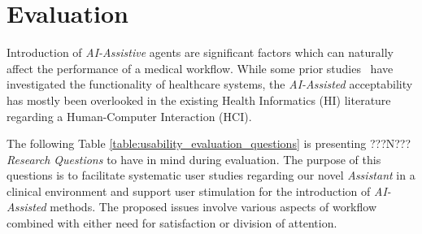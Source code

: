 
\section{Evaluation}
\label{sec:sec006}

Introduction of \textit{AI-Assistive} agents are significant factors which can naturally affect the performance of a medical workflow. While some prior studies~\cite{Calisto:2017:TTM:3132272.3134111, calistobreastscreening, calisto2017mimbcdui} have investigated the functionality of healthcare systems, the \textit{AI-Assisted} acceptability has mostly been overlooked in the existing Health Informatics (HI) literature regarding a Human-Computer Interaction (HCI).

The following Table \ref{table:usability_evaluation_questions} is presenting ???N??? \textit{Research Questions} to have in mind during evaluation. The purpose of this questions is to facilitate systematic user studies regarding our novel \textit{Assistant} in a clinical environment and support user stimulation for the introduction of \textit{AI-Assisted} methods. The proposed issues involve various aspects of workflow combined with either need for satisfaction or division of attention.

\hfill

